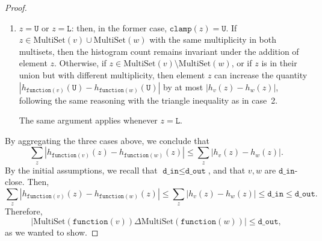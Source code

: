 \documentclass[11pt,a4paper]{article}
\theoremstyle{definition}
\newcommand{\MultiSet}{\mathrm{MultiSet}}
\newcommand{\din}{\texttt{d\_in}}
\newcommand{\dout}{\texttt{d\_out}}
\newcommand{\clamp}{\texttt{clamp}}
\newcommand{\function}{\texttt{function}}
\newcommand{\silvia}[1]{{ {\color{blue}{(silvia)~#1}}}}
\newcommand{\grace}[1]{{ {\color{purple}{(grace)~#1}}}}
\begin{document}
\begin{proof}
\begin{enumerate}
    \item $z = \texttt{U}$ or $z = \texttt{L}$: then, in the former case, $\clamp(z) = \texttt{U}$. If $z \in \MultiSet(v) \cup \MultiSet(w)$ with the same multiplicity in both multisets, then the histogram count remains invariant under the addition of element $z$. Otherwise, if $z \in \MultiSet(v) \setminus \MultiSet(w)$, or if $z$ is in their union but with different multiplicity, then element $z$ can increase the quantity $|h_{\function(v)}(\texttt{U}) - h_{\function(w)}(\texttt{U})|$ by at most $|h_v(z)-h_w(z)|$, following the same reasoning with the triangle inequality as in case~2.
    
    The same argument applies whenever $z = \texttt{L}$.
\end{enumerate}


By aggregating the three cases above, we conclude that
\[
\sum_z |h_{\function(v)}(z) - h_{\function(w)}(z)| \leq \sum_z |h_v(z) - h_w(z)|.
\]
By the initial assumptions, we recall that $\din \leq \dout$, and that $v, w$ are $\din$-close. Then,
\[
\sum_z |h_{\function(v)}(z) - h_{\function(w)}(z)| \leq \sum_z |h_v(z) - h_w(z)| \leq \din \leq \dout.
\]
Therefore, 
\[
|\MultiSet(\function(v)) \Delta \MultiSet(\function(w))| \leq \dout,
\]
as we wanted to show.
\end{proof}

\silvia{Maybe add domain of $z$ below the sum?}


\end{document}
